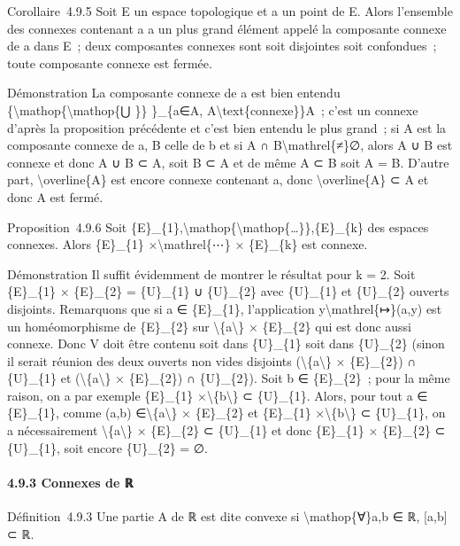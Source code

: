 \documentclass[]{article}
\begin{document}
Corollaire~4.9.5 Soit E un espace topologique et a un point de E. Alors
l'ensemble des connexes contenant a a un plus grand élément appelé la
composante connexe de a dans E~; deux composantes connexes sont soit
disjointes soit confondues~; toute composante connexe est fermée.

Démonstration La composante connexe de a est bien entendu
\{\textbackslash{}mathop\{\textbackslash{}mathop\{⋃ \}\} \}\_\{a∈A,
A\textbackslash{}text\{connexe\}\}A~; c'est un connexe d'après la
proposition précédente et c'est bien entendu le plus grand~; si A est la
composante connexe de a, B celle de b et si A ∩
B\textbackslash{}mathrel\{≠\}∅, alors A ∪ B est connexe et donc A ∪ B ⊂
A, soit B ⊂ A et de même A ⊂ B soit A = B. D'autre part,
\textbackslash{}overline\{A\} est encore connexe contenant a, donc
\textbackslash{}overline\{A\} ⊂ A et donc A est fermé.

Proposition~4.9.6 Soit
\{E\}\_\{1\},\textbackslash{}mathop\{\textbackslash{}mathop\{\ldots{}\}\},\{E\}\_\{k\}
des espaces connexes. Alors \{E\}\_\{1\} ×\textbackslash{}mathrel\{⋯\} ×
\{E\}\_\{k\} est connexe.

Démonstration Il suffit évidemment de montrer le résultat pour k = 2.
Soit \{E\}\_\{1\} × \{E\}\_\{2\} = \{U\}\_\{1\} ∪ \{U\}\_\{2\} avec
\{U\}\_\{1\} et \{U\}\_\{2\} ouverts disjoints. Remarquons que si a ∈
\{E\}\_\{1\}, l'application y\textbackslash{}mathrel\{↦\}(a,y) est un
homéomorphisme de \{E\}\_\{2\} sur \textbackslash{}\{a\textbackslash{}\}
× \{E\}\_\{2\} qui est donc aussi connexe. Donc V doit être contenu soit
dans \{U\}\_\{1\} soit dans \{U\}\_\{2\} (sinon il serait réunion des
deux ouverts non vides disjoints (\textbackslash{}\{a\textbackslash{}\}
× \{E\}\_\{2\}) ∩ \{U\}\_\{1\} et (\textbackslash{}\{a\textbackslash{}\}
× \{E\}\_\{2\}) ∩ \{U\}\_\{2\}). Soit b ∈ \{E\}\_\{2\}~; pour la même
raison, on a par exemple \{E\}\_\{1\}
×\textbackslash{}\{b\textbackslash{}\} ⊂ \{U\}\_\{1\}. Alors, pour tout
a ∈ \{E\}\_\{1\}, comme (a,b) ∈\textbackslash{}\{a\textbackslash{}\} ×
\{E\}\_\{2\} et \{E\}\_\{1\} ×\textbackslash{}\{b\textbackslash{}\} ⊂
\{U\}\_\{1\}, on a nécessairement \textbackslash{}\{a\textbackslash{}\}
× \{E\}\_\{2\} ⊂ \{U\}\_\{1\} et donc \{E\}\_\{1\} × \{E\}\_\{2\} ⊂
\{U\}\_\{1\}, soit encore \{U\}\_\{2\} = ∅.

\paragraph{4.9.3 Connexes de ℝ}

Définition~4.9.3 Une partie A de ℝ est dite convexe si
\textbackslash{}mathop\{∀\}a,b ∈ ℝ, {[}a,b{]} ⊂ ℝ.
\end{document}
